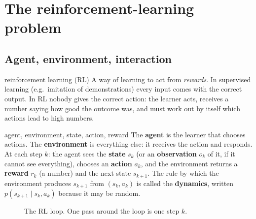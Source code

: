 \documentclass[11pt,a4paper]{article}
\begin{document}
\section{The reinforcement-learning problem}\label{sec:rl}

\subsection{Agent, environment, interaction}
\begin{newc}{reinforcement learning (RL)}
A way of learning to act from \emph{rewards}. In supervised learning (e.g.\ imitation of demonstrations) every input comes with the correct output. In RL nobody gives the correct action: the learner acts, receives a number saying how good the outcome was, and must work out by itself which actions lead to high numbers.
\end{newc}

\begin{newc}{agent, environment, state, action, reward}
The \textbf{agent} is the learner that chooses actions. The \textbf{environment} is everything else: it receives the action and responds. At each step $k$: the agent sees the \textbf{state} $s_k$ (or an \textbf{observation} $o_k$ of it, if it cannot see everything), chooses an \textbf{action} $a_k$, and the environment returns a \textbf{reward} $r_k$ (a number) and the next state $s_{k+1}$. The rule by which the environment produces $s_{k+1}$ from $(s_k,a_k)$ is called the \textbf{dynamics}, written $p(s_{k+1}\mid s_k,a_k)$ because it may be random.
\end{newc}

\begin{figure}[h]
\centering
{}
\caption{The RL loop. One pass around the loop is one step $k$.}
\end{figure}
\end{document}
